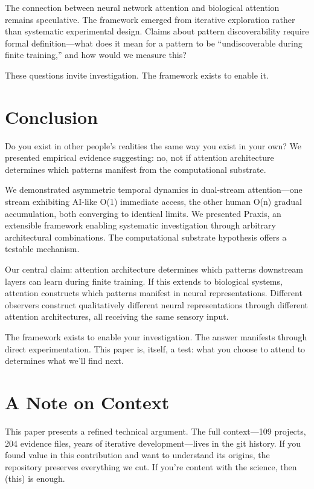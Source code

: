 \documentclass{article}
\begin{document}
The connection between neural network attention and biological attention remains speculative. The framework emerged from iterative exploration rather than systematic experimental design. Claims about pattern discoverability require formal definition—what does it mean for a pattern to be ``undiscoverable during finite training,'' and how would we measure this?

These questions invite investigation. The framework exists to enable it.

\section{Conclusion}

Do you exist in other people's realities the same way you exist in your own? We presented empirical evidence suggesting: no, not if attention architecture determines which patterns manifest from the computational substrate.

We demonstrated asymmetric temporal dynamics in dual-stream attention—one stream exhibiting AI-like O(1) immediate access, the other human O(n) gradual accumulation, both converging to identical limits. We presented Praxis, an extensible framework enabling systematic investigation through arbitrary architectural combinations. The computational substrate hypothesis offers a testable mechanism.

Our central claim: attention architecture determines which patterns downstream layers can learn during finite training. If this extends to biological systems, attention constructs which patterns manifest in neural representations. Different observers construct qualitatively different neural representations through different attention architectures, all receiving the same sensory input.

The framework exists to enable your investigation. The answer manifests through direct experimentation. This paper is, itself, a test: what you choose to attend to determines what we'll find next.

\section*{A Note on Context}

This paper presents a refined technical argument. The full context—109 projects, 204 evidence files, years of iterative development—lives in the git history. If you found value in this contribution and want to understand its origins, the repository preserves everything we cut. If you're content with the science, then (this) is enough.

    {\small
        
        
    }
\end{document}
